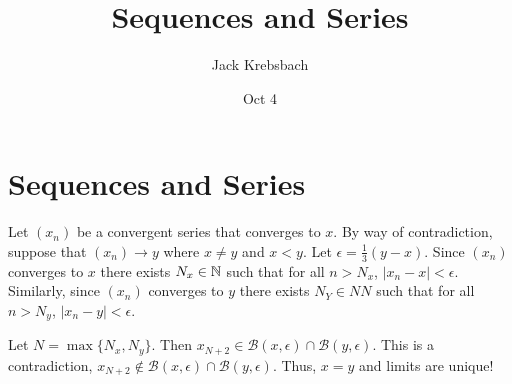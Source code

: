 \documentclass{report}
\title{Sequences and Series}
\author{Jack Krebsbach }
\date{Oct 4}
\begin{document}
\maketitle

\section{Sequences and Series}




\begin{myproof}
  Let $(x_n)$ be a convergent series that converges to $x.$ By way of contradiction, suppose that $(x_n) \rightarrow y$ where $x \neq y$ and $x < y$. Let $\epsilon = \frac{1}{3}(y-x).$  Since $(x_n)$ converges to $x$ there exists $N_x \in \NN$ such that for all $n> N_x$, $|x_n - x| < \epsilon.$ Similarly, since $(x_n)$ converges to $y$ there exists $N_Y \in NN$ such that for all $n> N_y$, $|x_n - y| <\epsilon.$ 

  \par Let $N = \max\{N_x, N_y\}.$  Then $x_{N+2} \in \mathcal{B}(x,\epsilon) \cap \mathcal{B}(y,\epsilon)$. This is a contradiction, $x_{N+2} \not\in \mathcal{B}(x,\epsilon) \cap \mathcal{B}(y,\epsilon).$ Thus,  $x=y$ and limits are unique!
\end{myproof}

\pagebreak




















 
\end{document}
